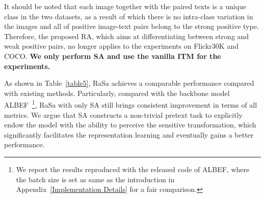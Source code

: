 \documentclass{article}
\begin{document}


It should be noted that each image together with the paired texts is a unique class in the two datasets, as a result of which there is no intra-class variation in the images and all of positive image-text pairs belong to the strong positive type.
Therefore, the proposed RA, which aims at differentiating between strong and weak positive pairs, no longer applies to the experiments on Flickr30K and COCO.
\textbf{We only perform SA and use the vanilla ITM for the experiments.}



As shown in Table~\ref{table5}, RaSa achieves a comparable performance compared with existing methods. 
Particularly, compared with the backbone model ALBEF~\cite{NEURIPS2021_50525975}\footnote{We report the results reproduced with the released code of ALBEF, where the batch size is set as same as the introduction in Appendix~\ref{Implementation Details} for a fair comparison.}, RaSa with only SA still brings consistent improvement in terms of all metrics.
We argue that SA constructs a non-trivial pretext task to explicitly endow the model with the ability to perceive the sensitive transformation, which significantly facilitates the representation learning and eventually gains a better performance.
\end{document}
